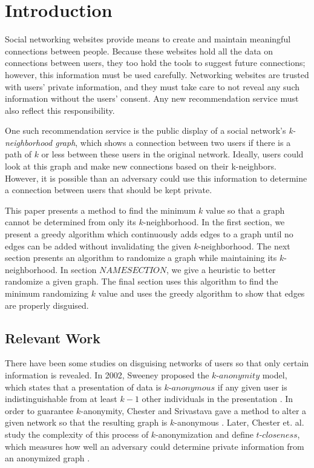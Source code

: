 \section{Introduction}

\indent Social networking websites provide means to create and maintain meaningful connections between people. Because these websites hold all the data on connections between users, they too hold the tools to suggest future connections; however, this information must be used carefully. Networking websites are trusted with users' private information, and they must take care to not reveal any such information without the users' consent. Any new recommendation service must also reflect this responsibility.

\indent One such recommendation service is the public display of a social network's  \emph{k-neighborhood graph}, which shows a connection between two users if there is a path of $k$ or less between these users in the original network. Ideally,  users could look at this graph and make new connections based on their k-neighbors. However, it is possible than an adversary could use this information to determine a connection between users that should be kept private. 

\indent This paper presents a method to find the minimum $k$ value so that a graph cannot be determined from only its $k$-neighborhood. In the first section, we present a greedy algorithm which continuously adds edges to a graph until no edges can be added without invalidating the given $k$-neighborhood. The next section presents an algorithm to randomize a graph while maintaining its $k$-neighborhood. In section $NAME SECTION$, we give a heuristic to better randomize a given graph. The final section uses this algorithm to find the minimum randomizing $k$ value and uses the greedy algorithm to show that edges are properly disguised. 

\subsection {Relevant Work}

\indent There have been some studies on disguising networks of users so that only certain information is revealed. In 2002, Sweeney proposed the $k$-$anonymity$ model, which states that a presentation of data is $k$-$anonymous$ if any given user is indistinguishable from at least $k-1$ other individuals in the presentation \cite{Sweeney02}. In order to guarantee $k$-anonymity, Chester and Srivastava gave a method to alter a given network so that the resulting graph is $k$-anonymous \cite{Chester11}. Later, Chester et. al. study the complexity of this process of $k$-anonymization and define $t$-$closeness$, which measures how well an adversary could determine private information from an anonymized graph \cite{Chester13}.